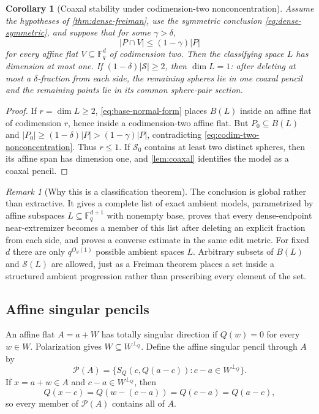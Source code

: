 \documentclass[11pt,letterpaper]{amsart}
\newtheorem{corollary}[corollary]{Corollary}
\theoremstyle{definition}
\theoremstyle{remark}
\newtheorem{remark}[remark]{Remark}
\newcommand{\1}{\mathbf 1}
\begin{document}
\begin{corollary}[Coaxal stability under codimension-two nonconcentration]\label{cor:dense-coaxal}
Assume the hypotheses of \cref{thm:dense-freiman}, use the symmetric conclusion \eqref{eq:dense-symmetric}, and suppose that for some $\gamma>\delta$,
\begin{equation}\label{eq:codim-two-nonconcentration}
 |P\cap V|\le(1-\gamma)|P|
\end{equation}
for every affine flat $V\subseteq\mathbb F_q^d$ of codimension two.  Then the classifying space $L$ has dimension at most one.  If $(1-\delta)|\mathcal S|\ge2$, then $\dim L=1$: after deleting at most a $\delta$-fraction from each side, the remaining spheres lie in one coaxal pencil and the remaining points lie in its common sphere-pair section.
\end{corollary}

\begin{proof}
If $r=\dim L\ge2$, \eqref{eq:base-normal-form} places $B(L)$ inside an affine flat of codimension $r$, hence inside a codimension-two affine flat.  But $P_0\subseteq B(L)$ and $|P_0|\ge(1-\delta)|P|>(1-\gamma)|P|$, contradicting \eqref{eq:codim-two-nonconcentration}.  Thus $r\le1$.  If $\mathcal S_0$ contains at least two distinct spheres, then its affine span has dimension one, and \cref{lem:coaxal} identifies the model as a coaxal pencil.
\end{proof}

\begin{remark}[Why this is a classification theorem]\label{rem:dense-level3}
The conclusion is global rather than extractive.  It gives a complete list of exact ambient models, parametrized by affine subspaces $L\subseteq\mathbb F_q^{d+1}$ with nonempty base, proves that every dense-endpoint near-extremizer becomes a member of this list after deleting an explicit fraction from each side, and proves a converse estimate in the same edit metric.  For fixed $d$ there are only $q^{O_d(1)}$ possible ambient spaces $L$.  Arbitrary subsets of $B(L)$ and $\mathcal S(L)$ are allowed, just as a Freiman theorem places a set inside a structured ambient progression rather than prescribing every element of the set.
\end{remark}

\subsection{Affine singular pencils}

An affine flat $A=a+W$ has totally singular direction if $Q(w)=0$ for every $w\in W$.  Polarization gives $W\subseteq W^{\perp_Q}$.  Define the affine singular pencil through $A$ by
\begin{equation}\label{eq:affine-pencil}
 \mathcal P(A)=
 \{S_Q(c,Q(a-c)):c-a\in W^{\perp_Q}\}.
\end{equation}
If $x=a+w\in A$ and $c-a\in W^{\perp_Q}$, then
\[
 Q(x-c)=Q(w-(c-a))=Q(c-a)=Q(a-c),
\]
so every member of $\mathcal P(A)$ contains all of $A$.
\end{document}
